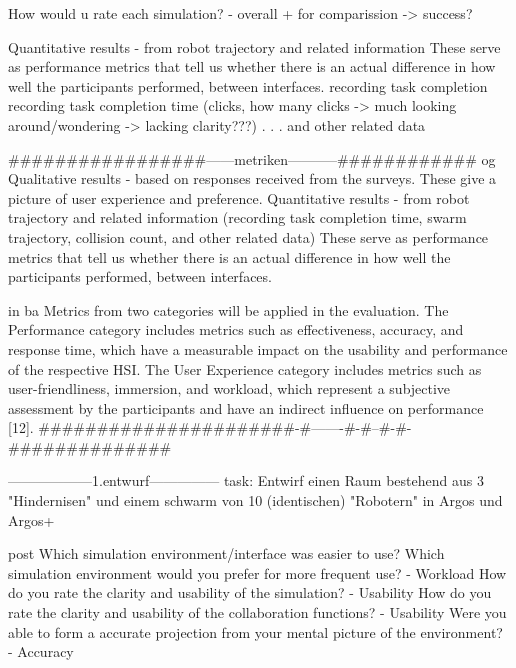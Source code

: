 \documentclass[german,version-2020-11]{uzl-thesis}
\begin{document}
\begin{Code}
              
              How would u rate each simulation? - overall + for comparission -> success?
        
      
        Quantitative results - from robot trajectory and related information 
          These serve as performance metrics that tell us whether there is an actual difference in how well 
          the participants performed, between interfaces. 
            recording task completion  
            recording task completion time
            (clicks, how many clicks -> much looking around/wondering -> lacking clarity???)
            .
            .
            .
            and other related data
      
      
      #################------metriken-----------############
        og
        Qualitative results - based on responses received from the surveys. 
          These give a picture of user experience and preference. 
        Quantitative results - from robot trajectory and related information 
          (recording task completion time, swarm trajectory, collision count, and other related data)
          These serve as performance metrics that tell us whether there is an actual difference in how well 
          the participants performed, between interfaces. 
          
      
      
        in ba
        Metrics from two categories will be applied in the evaluation. 
          The Performance category includes metrics such as effectiveness, accuracy, and response time, 
            which have a measurable impact on the usability and performance of the respective HSI. 
          The User Experience category includes metrics such as user-friendliness, immersion, and workload, 
            which represent a subjective assessment by the participants and have an indirect influence on performance [12].
      ######################-#-------#-#--#-#-############## 
      
      
      
      
      ------------------1.entwurf---------------
      task: Entwirf einen Raum bestehend aus 3 "Hindernisen" und einem schwarm von 10 (identischen) "Robotern" in Argos und Argos+
      
      post
        Which simulation environment/interface was easier to use?
        Which simulation environment would you prefer for more frequent use? - Workload  
        How do you rate the clarity and usability of the simulation? - Usability
        How do you rate the clarity and usability of the collaboration functions? - Usability
        Were you able to form a accurate projection from your mental picture of the environment? - Accuracy
        

\end{Code}
\end{document}
